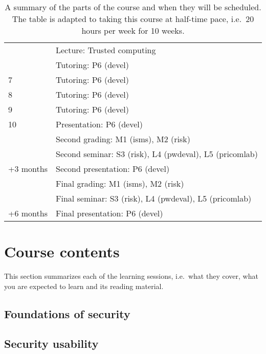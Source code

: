 \begin{table}
\begin{tabular}{lp{9cm}}
      & Lecture: Trusted computing\\
      & Tutoring: P6 (devel)\\
    \midrule
    7
      & Tutoring: P6 (devel)\\
    \midrule
    8
      & Tutoring: P6 (devel)\\
    \midrule
    9
      & Tutoring: P6 (devel)\\
    \midrule
    10
      & Presentation: P6 (devel)\\
      & Second grading: M1 (isms), M2 (risk)\\
      & Second seminar: S3 (risk), L4 (pwdeval), L5 (pricomlab)\\
    \midrule
    +3 months
      & Second presentation: P6 (devel)\\
      & Final grading: M1 (isms), M2 (risk)\\
      & Final seminar: S3 (risk), L4 (pwdeval), L5 (pricomlab)\\
    \midrule
    +6 months
      & Final presentation: P6 (devel)\\
    \bottomrule
  \end{tabular}
  \caption{%
    A summary of the parts of the course and when they will be scheduled.
    The table is adapted to taking this course at half-time pace, i.e.\ 20 
    hours per week for 10 weeks.
  }\label{Schedule}
\end{table}


\section{Course contents}%
\label{CourseContents}

This section summarizes each of the learning sessions, i.e.\ what they cover, 
what you are expected to learn and its reading material.

%
%
\subsection{Foundations of security}


\subsection{Security usability}



